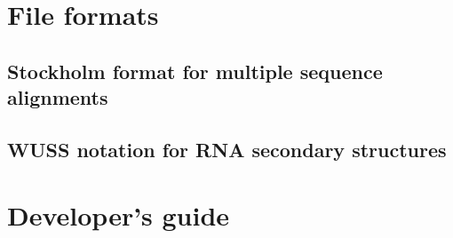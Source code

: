 \documentclass[10pt]{book}
\begin{document}
\newpage
\chapter{File formats}

\section{Stockholm format for multiple sequence alignments}




\newpage
\section{WUSS notation for RNA secondary structures}



\newpage
\chapter{Developer's guide}



\newpage
\newcommand{\bibfont}{\footnotesize}


\end{document}
